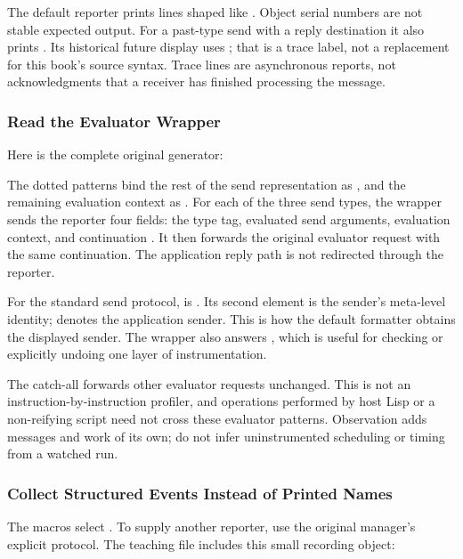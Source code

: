 The default reporter prints lines shaped like
\code{[target <== payload from sender]}. Object serial numbers are not
stable expected output. For a past-type send with a reply destination it
also prints . Its historical future display uses
\code{<<=}; that is a trace label, not a replacement for this book's
\code{[target <= payload \$ future]} source syntax.
Trace lines are asynchronous reports, not acknowledgments that a
receiver has finished processing the message.

\subsubsection{Read the Evaluator Wrapper}

Here is the complete original generator:


The dotted patterns bind the rest of the send representation as
, and the remaining evaluation context as .
For each of the three send types, the wrapper sends the reporter four
fields: the type tag, evaluated send arguments, evaluation context, and
continuation . It then forwards the original evaluator request
with the same continuation. The application reply path is not redirected
through the reporter.

For the standard send protocol,  is
. Its second element is the sender's meta-level
identity; \code{[den Id]} denotes the application sender. This is how
the default formatter obtains the displayed sender. The wrapper also
answers , which is useful for checking or
explicitly undoing one layer of instrumentation.

The catch-all forwards other evaluator requests unchanged. This is not
an instruction-by-instruction profiler, and operations performed by host
Lisp or a non-reifying script need not cross these evaluator patterns.
Observation adds messages and work of its own; do not infer uninstrumented
scheduling or timing from a watched run.

\subsubsection{Collect Structured Events Instead of Printed Names}

The macros select . To supply another
reporter, use the original manager's explicit protocol. The teaching
file includes this small recording object:

